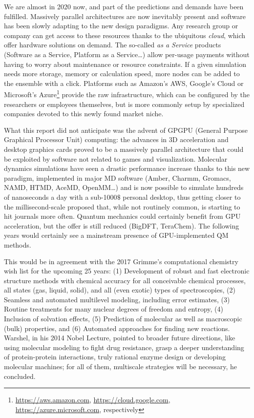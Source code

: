 We are almost in 2020 now, and part of the predictions and demands have been fulfilled. Massively parallel architectures are now inevitably present and software has been slowly adapting to the new design paradigms. Any research group or company can get access to these resources thanks to the ubiquitous \textit{cloud}, which offer hardware solutions on demand. The so-called \textit{as a Service}  products (Software as a Service, Platform as a Service\ldots) allow per-usage payments without having to worry about maintenance or resource constraints. If a given simulation needs more storage, memory or calculation speed, more nodes can be added to the ensemble with a click. Platforms such as Amazon's AWS, Google's Cloud or Microsoft's Azure\footnote{\url{https://aws.amazon.com}, \url{https://cloud.google.com}, \url{https://azure.microsoft.com}, respectively} provide the raw infrastructure, which can be configured by the researchers or employees themselves, but is more commonly setup by specialized companies devoted to this newly found market niche.

What this report did not anticipate was the advent of GPGPU (General Purpose Graphical Processor Unit) computing: the advances in 3D acceleration and desktop graphics cards proved to be a massively parallel architecture that could be exploited by software not related to games and visualization. Molecular dynamics simulations have seen a drastic performance increase thanks to this new paradigm, implemented in major MD software (Amber, Charmm, Gromacs, NAMD, HTMD, AceMD, OpenMM\ldots) and is now possible to simulate hundreds of nanoseconds a day with a sub-1000$\$$  personal desktop, thus getting closer to the millisecond-scale proposed that, while not routinely common, is starting to hit journals more often.\cite{shaw2008anton,lane2013} Quantum mechanics could certainly benefit from GPU acceleration, but the offer is still reduced (BigDFT,\cite{genovese2011daubechies} TeraChem\cite{luehr2011dynamic}). The following years would certainly see a mainstream presence of GPU-implemented QM methods.

This would be in agreement with the 2017 Grimme's computational chemistry wish list for the upcoming 25 years: (1) Development of robust and fast electronic structure methods with chemical accuracy for all conceivable chemical processes, all states (gas, liquid, solid), and all (even exotic) types of spectroscopies, (2) Seamless and automated multilevel modeling, including error estimates, (3) Routine treatments for many nuclear degrees of freedom and entropy, (4) Inclusion of solvation effects, (5) Prediction of molecular as well as macroscopic (bulk) properties, and (6) Automated approaches for finding new reactions. Warshel, in his 2014 Nobel Lecture, pointed to broader future directions, like using molecular modeling to fight drug resistance, grasp a deeper understanding of protein-protein interactions, truly rational enzyme design or developing molecular machines; for all of them, multiscale strategies will be necessary, he concluded.\cite{Warshel2014}

